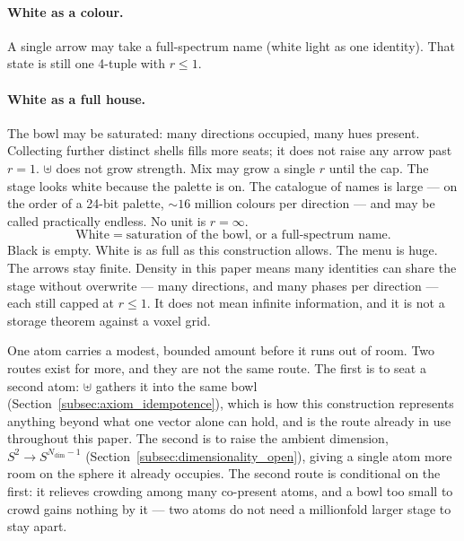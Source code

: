 \documentclass[12pt, a4paper]{article}
\begin{document}
\paragraph{White as a colour.}
A single arrow may take a full-spectrum name (white light as one
identity). That state is still one 4-tuple with $r\le 1$.

\paragraph{White as a full house.}
The bowl may be saturated: many directions occupied, many hues present.
Collecting further distinct shells fills more seats; it does not raise
any arrow past $r=1$. $\uplus$ does not grow strength. Mix may grow a
single $r$ until the cap. The stage looks white because the palette is on. The catalogue
of names is large --- on the order of a 24-bit palette,
$\sim 16$ million colours per direction --- and may be called
practically endless. No unit is $r=\infty$.
\begin{equation}
    \text{White} \;=\; \text{saturation of the bowl, or a full-spectrum name.}
    \label{eq:white_state}
\end{equation}
Black is empty. White is as full as this construction allows. The
menu is huge. The arrows stay finite.
Density in this paper means many identities can share the stage
without overwrite --- many directions, and many phases per direction
--- each still capped at $r\le 1$. It does not mean infinite
information, and it is not a storage theorem against a voxel grid.

One atom carries a modest, bounded amount before it runs out of room.
Two routes exist for more, and they are not the same route. The first
is to seat a second atom: $\uplus$ gathers it into the same bowl
(Section~\ref{subsec:axiom_idempotence}), which is how this
construction represents anything beyond what one vector alone can
hold, and is the route already in use throughout this paper. The
second is to raise the ambient dimension, $S^2\to S^{N_{\mathrm{dim}}-1}$
(Section~\ref{subsec:dimensionality_open}), giving a single atom more room
on the sphere it already occupies. The second route is conditional on
the first: it relieves crowding among many co-present atoms, and a
bowl too small to crowd gains nothing by it --- two atoms do not
need a millionfold larger stage to stay apart.
\end{document}
